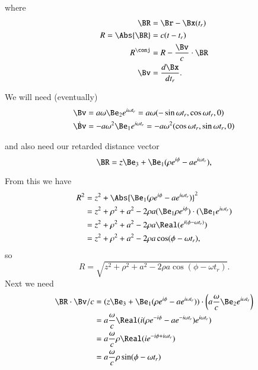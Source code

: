 {where
%
\begin{equation}\label{eqn:relativisticElectrodynamicsExamReflection:70}
\begin{aligned}
\BR &= \Br - \Bx(t_r) \\
R = \Abs{\BR} &= c (t - t_r) \\
R^\conj &= R - \frac{\Bv}{c} \cdot \BR \\
\Bv &= \frac{d\Bx}{dt_r}.
\end{aligned}
\end{equation}

We will need (eventually)
%
\begin{equation}\label{eqn:relativisticElectrodynamicsExamReflection:90}
\begin{aligned}
\Bv &= a \omega \Be_2 e^{i \omega t_r} = a \omega ( -\sin \omega t_r, \cos\omega t_r, 0) \\
\dot{\Bv} &= -a \omega^2 \Be_1 e^{i \omega t_r} =
-a \omega^2 (\cos\omega t_r, \sin\omega t_r, 0)
\end{aligned}
\end{equation}

and also need our retarded distance vector
%
\begin{equation}\label{eqn:relativisticElectrodynamicsExamReflection:110}
\BR = z \Be_3 + \Be_1 (\rho e^{i \phi} - a e^{i \omega t_r} ),
\end{equation}

From this we have
%
\begin{equation}\label{eqn:relativisticElectrodynamicsExamReflection:1050}
\begin{aligned}
R^2
&= z^2 + \Abs{\Be_1 (\rho e^{i \phi} - a e^{i \omega t_r} )}^2 \\
&= z^2 + \rho^2 + a^2 - 2 \rho a (\Be_1 \rho e^{i \phi}) \cdot (\Be_1 e^{i \omega t_r}) \\
&= z^2 + \rho^2 + a^2 - 2 \rho a \Real( e^{ i(\phi - \omega t_r) } ) \\
&= z^2 + \rho^2 + a^2 - 2 \rho a \cos(\phi - \omega t_r),
\end{aligned}
\end{equation}
so
\begin{equation}\label{eqn:relativisticElectrodynamicsExamReflection:130}
R = \sqrt{z^2 + \rho^2 + a^2 - 2 \rho a \cos( \phi - \omega t_r ) }.
\end{equation}
Next we need
%
\begin{equation}\label{eqn:relativisticElectrodynamicsExamReflection:1070}
\begin{aligned}
\BR \cdot \Bv/c
&=
(z \Be_3 + \Be_1 (\rho e^{i \phi} - a e^{i \omega t_r} )) \cdot
\left(a \frac{\omega}{c} \Be_2 e^{i \omega t_r} \right) \\
&=
a \frac{\omega }{c}
\Real(
i (\rho e^{-i \phi} - a e^{-i \omega t_r} ) e^{i \omega t_r} ) \\
&=
a \frac{\omega }{c}
\rho \Real( i e^{-i \phi + i \omega t_r} ) \\
&=
a \frac{\omega }{c}
\rho \sin(\phi - \omega t_r)
\end{aligned}
\end{equation}

}

